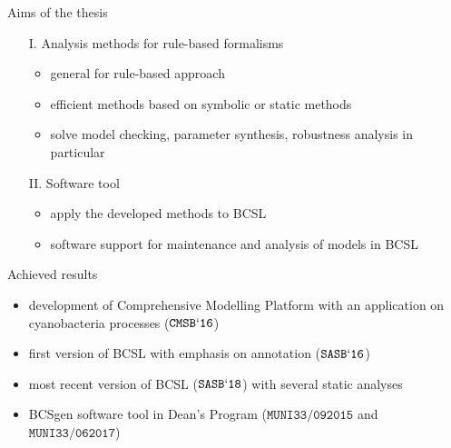 \documentclass[10pt]{beamer}
\begin{document}

\begin{frame}[fragile]{Aims of the thesis}

\begin{enumerate}
	\item[I.] Analysis methods for rule-based formalisms

	\begin{itemize}
		\item general for rule-based approach
		\item efficient methods based on symbolic or static methods
		\item solve model checking, parameter synthesis, robustness analysis in particular
	\end{itemize}

	\item[II.] Software tool

	\begin{itemize}
		\item apply the developed methods to BCSL
		\item software support for maintenance and analysis of models in BCSL
	\end{itemize}
\end{enumerate}

\end{frame}


\begin{frame}[fragile]{Achieved results}

\begin{itemize}
	\item development of Comprehensive Modelling Platform with an application on cyanobacteria processes ($\mathtt{CMSB`16}$)
	\item first version of BCSL with emphasis on annotation ($\mathtt{SASB`16}$)
	\item most recent version of BCSL ($\mathtt{SASB`18}$) with several static analyses
	\item BCSgen software tool in Dean’s Program ($\mathtt{MUNI33/092015}$ and $\mathtt{MUNI33/062017}$)
\end{itemize}

\end{frame}

\end{document}
